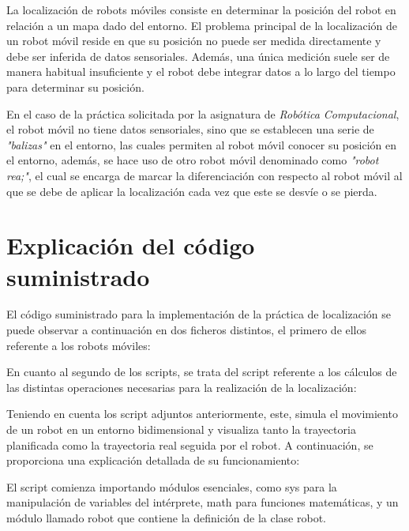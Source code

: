 \documentclass[11pt]{report}
\begin{document}
La localización de robots móviles consiste en determinar la posición del robot en relación a un mapa dado del entorno. El problema principal de la localización de un robot móvil reside en que su posición no puede ser medida directamente y debe ser inferida de datos sensoriales. Además, una única medición suele ser de manera habitual insuficiente y el robot debe integrar datos a lo largo del tiempo para determinar su posición.

En el caso de la práctica solicitada por la asignatura de \emph{Robótica Computacional}, el robot móvil no tiene datos sensoriales, sino que se establecen una serie de \emph{"balizas"} en el entorno, las cuales permiten al robot móvil conocer su posición en el entorno, además, se hace uso de otro robot móvil denominado como \emph{"robot rea;"}, el cual se encarga de marcar la diferenciación con respecto al robot móvil al que se debe de aplicar la localización cada vez que este se desvíe o se pierda.

\section{Explicación del código suministrado}

El código suministrado para la implementación de la práctica de localización se puede observar a continuación en dos ficheros distintos, el primero de ellos referente a los robots móviles:



En cuanto al segundo de los scripts, se trata del script referente a los cálculos de las distintas operaciones necesarias para la realización de la localización:



Teniendo en cuenta los script adjuntos anteriormente, este, simula el movimiento de un robot en un entorno bidimensional y visualiza tanto la trayectoria planificada como la trayectoria real seguida por el robot. A continuación, se proporciona una explicación detallada de su funcionamiento:

El script comienza importando módulos esenciales, como sys para la manipulación de variables del intérprete, math para funciones matemáticas, y un módulo llamado robot que contiene la definición de la clase robot.
\end{document}
